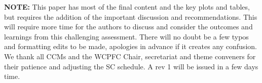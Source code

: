 \textbf{NOTE:} This paper has most of the final content and the key plots and tables, but requires the addition of the important discussion and recommendations. This will require more time for the authors to discuss and consider the outcomes and learnings from this challenging assessment. There will no doubt be a few typos and formatting edits to be made, apologies in advance if it creates any confusion. We thank all CCMs and the WCPFC Chair, secretariat and theme conveners for their patience and adjusting the SC schedule. A rev 1 will be issued in a few days time.

\clearpage
